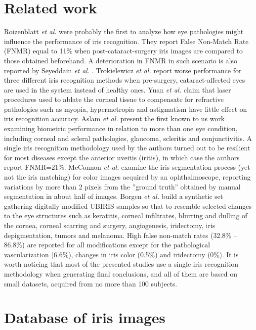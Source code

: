 \documentclass[10pt,twocolumn,letterpaper]{article}
\begin{document}
\section{Related work}
\label{sec:RelatedWork}

Roizenblatt \emph{et al.} \cite{Roizenblatt} were probably the first to analyze how eye pathologies might influence the performance of iris recognition. They report False Non-Match Rate (FNMR) equal to 11\% when post-cataract-surgery iris images are compared to those obtained beforehand. A deterioration in FNMR in such scenario is also reported by Seyeddain \emph{et al.} \cite{Seyeddain2014}. Trokielewicz \emph{et al.} \cite{TrokielewiczWilga2014} report worse performance for three different iris recognition methods when pre-surgery, cataract-affected eyes are used in the system instead of healthy ones. Yuan \emph{et al.} \cite{Yuan} claim that laser procedures used to ablate the corneal tissue to compensate for refractive pathologies such as myopia, hypermetropia and astigmatism have little effect on iris recognition accuracy. Aslam \emph{et al.} \cite{Aslam} present the first known to us work examining biometric performance in relation to more than one eye condition, including corneal and scleral pathologies, glaucoma, scleritis and conjunctivitis. A single iris recognition methodology used by the authors turned out to be resilient for most diseases except the anterior uveitis (iritis), in which case the authors report FNMR=21\%. McConnon \emph{et al.} \cite{McConnon2012} examine the iris segmentation process (yet not the iris matching) for color images acquired by an ophthalmoscope, reporting variations by more than 2 pixels from the ''ground truth'' obtained by manual segmentation in about half of images. Borgen \emph{et al.} \cite{Borgen} build a synthetic set gathering digitally modified UBIRIS samples so that to resemble selected changes to the eye structures such as keratitis, corneal infiltrates, blurring and dulling of the cornea, corneal scarring and surgery, angiogenesis, iridectomy, iris depigmentation, tumors and melanoma. High false non-match rates (32.8\% -- 86.8\%) are reported for all modifications except for the pathological vascularization (6.6\%), changes in iris color (0.5\%) and iridectomy (0\%). It is worth noticing that most of the presented studies use a single iris recognition methodology when generating final conclusions, and all of them are based on small datasets, acquired from no more than 100 subjects.

\section{Database of iris images}
\label{sec:Database}
\end{document}

